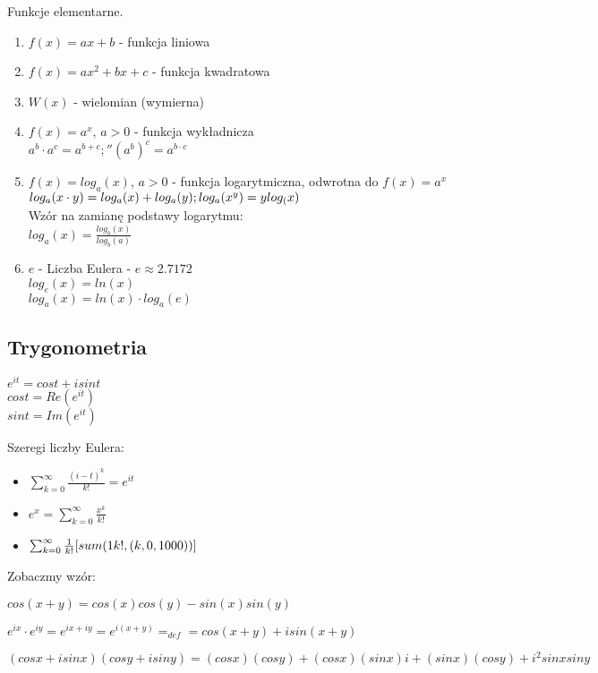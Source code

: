 \documentclass{article}
\theoremstyle{definition}
\theoremstyle{definition}
\theoremstyle{definition}
\theoremstyle{definition}
\begin{document}
Funkcje elementarne.
\begin{enumerate}
    \item $f(x)=ax+b$ - funkcja liniowa
    \item $f(x)=ax^2+bx+c$ - funkcja kwadratowa
    \item $W(x)$ - wielomian (wymierna)
    \item $f(x)=a^x$, $a>0$ - funkcja wykładnicza\\
    $a^b\cdot a^c=a^{b+c};'' (a^b)^c=a^{b\cdot c}$
    \item $f(x)=log_a(x)$, $a>0$ - funkcja logarytmiczna, odwrotna do $f(x)=a^x$\\
    $log_a(x\cdot y)=log_a(x)+log_a(y);\\ log_a(x^y)=ylog_(x)$\\
    Wzór na zamianę podstawy logarytmu:\\
    $log_a(x)=\frac{log_b(x)}{log_b(a)}$
    \item $e$ - Liczba Eulera - $e\approx 2.7172$\\
    $log_e(x)=ln(x)$\\
    $log_a(x)=ln(x)\cdot log_a(e)$
\end{enumerate}

\subsection{Trygonometria}
\begin{center}
$e^{it}=cost + isint$\\
$cost = Re(e^{it})$\\
$sint = Im(e^{it})$
\end{center}

Szeregi liczby Eulera:
\begin{itemize}
    \item $\sum_{k=0}^{\infty} \frac{(i-t)^k}{k!}=e^{it}$
    \item $e^x = \sum_{k=0}^{\infty} \frac{x^k}{k!}$
    \item $\sum_{k=0}^{\infty} \frac{1}{k!} [sum(1\/k!, (k,0,1000))]$
\end{itemize}

Zobaczmy wzór:

$cos(x+y)=cos(x)cos(y)-sin(x)sin(y)$

$e^{ix}\cdot e^{iy} = e^{ix + iy}=e^{i(x+y)}=_{def}=cos(x+y)+isin(x+y)$

$(cosx + isinx)(cosy + isiny)=(cosx) (cosy) + (cosx) (sinx) i + (sinx) (cosy) + i^2 sinx siny$
\end{document}
